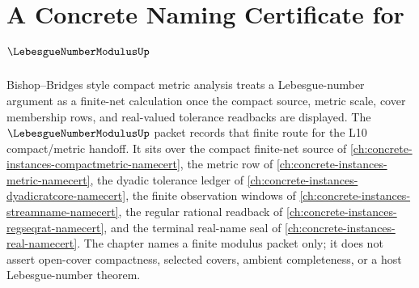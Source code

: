 \chapter{A Concrete Naming Certificate for $\LebesgueNumberModulusUp$}
\label{ch:concrete-instances-lebesgue-number-modulus-namecert}

Bishop--Bridges style compact metric analysis treats a Lebesgue-number argument as a finite-net calculation once the compact source, metric scale, cover membership rows, and real-valued tolerance readbacks are displayed. The $\LebesgueNumberModulusUp$ packet records that finite route for the L10 compact/metric handoff. It sits over the compact finite-net source of \autoref{ch:concrete-instances-compactmetric-namecert}, the metric row of \autoref{ch:concrete-instances-metric-namecert}, the dyadic tolerance ledger of \autoref{ch:concrete-instances-dyadicratcore-namecert}, the finite observation windows of \autoref{ch:concrete-instances-streamname-namecert}, the regular rational readback of \autoref{ch:concrete-instances-regseqrat-namecert}, and the terminal real-name seal of \autoref{ch:concrete-instances-real-namecert}. The chapter names a finite modulus packet only; it does not assert open-cover compactness, selected covers, ambient completeness, or a host Lebesgue-number theorem.

